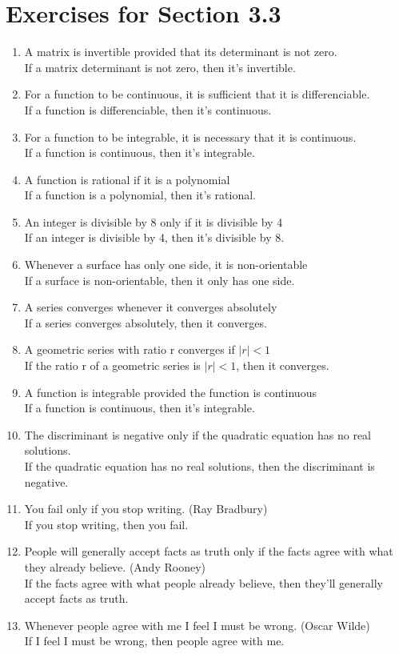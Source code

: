 \documentclass[12pt]{article}
\begin{document}
\section*{Exercises for Section 3.3}
\begin{enumerate}
	\item A matrix is invertible provided that its determinant is not zero.\\
	    If a matrix determinant is not zero, then it's invertible.
	\item For a function to be continuous, it is sufficient that it is differenciable.\\
	    If a function is differenciable, then it's continuous.
	\item For a function to be integrable, it is necessary that it is continuous.\\
	    If a function is continuous, then it's integrable.
	\item A function is rational if it is a polynomial\\
	    If a function is a polynomial, then it's rational.
	\item An integer is divisible by 8 only if it is divisible by 4\\
	    If an integer is divisible by 4, then it's divisible by 8.
	\item Whenever a surface has only one side, it is non-orientable\\
	    If a surface is non-orientable, then it only has one side.
	\item A series converges whenever it converges absolutely\\
	    If a series converges absolutely, then it converges.
	\item A geometric series with ratio r converges if $|r| < 1$\\
	    If the ratio r of a geometric series is $|r| < 1$, then it converges.
	\item A function is integrable provided the function is continuous\\
	    If a function is continuous, then it's integrable.
	\item The discriminant is negative only if the quadratic equation has no real solutions.\\
	    If the quadratic equation has no real solutions, then the discriminant is negative.
	\item You fail only if you stop writing. (Ray Bradbury)\\
	    If you stop writing, then you fail.
	\item People will generally accept facts as truth only if the facts agree with what they already believe. (Andy Rooney)\\
	    If the facts agree with what people already believe, then they'll generally accept facts as truth.
	\item Whenever people agree with me I feel I must be wrong. (Oscar Wilde)\\
	    If I feel I must be wrong, then people agree with me.
\end{enumerate}
\end{document}
